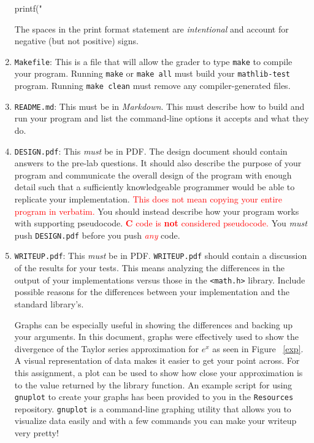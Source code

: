 \documentclass[11pt]{article}
\begin{document}
\begin{enumerate}
    \begin{codelisting}{}
printf(" %
    \end{codelisting}

    The spaces in the print format statement are \emph{intentional} and account for
    negative (but not positive) signs.

  \item \texttt{Makefile}: This is a file that will allow the grader to type
    \texttt{make} to compile your program. Running \texttt{make} or \texttt{make
    all} must build your \texttt{mathlib-test} program. Running \texttt{make clean}
    must remove any compiler-generated files.

  \item \texttt{README.md}: This must be in \emph{Markdown}. This must describe
    how to build and run your program and list the command-line options it
    accepts and what they do.

  \item \texttt{DESIGN.pdf}: This \emph{must} be in PDF\@. The design document
    should contain answers to the pre-lab questions. It should also describe the
    purpose of your program and communicate the overall design of the program
    with enough detail such that a sufficiently knowledgeable programmer would
    be able to replicate your implementation. \textcolor{red}{This does not
    mean copying your entire program in verbatim.} You should instead describe
    how your program works with supporting pseudocode.
    \textcolor{red}{\textbf{C} code is \textbf{not} considered pseudocode.} You
    \emph{must} push \texttt{DESIGN.pdf} before you push \textcolor{red}{\emph{any}}
    code.

  \item \texttt{WRITEUP.pdf}: This \emph{must} be in PDF\@. \texttt{WRITEUP.pdf}
    should contain a discussion of the results for your tests. This means
    analyzing the differences in the output of your implementations versus those
    in the \texttt{<math.h>} library. Include possible reasons for the differences
    between your implementation and the standard library's.

    Graphs can be especially useful in showing the differences and backing up your arguments. In this document, graphs were effectively used to show the divergence of the Taylor
    series approximation for $e^x$ as seen in Figure ~\ref{exp}. A visual representation of
    data makes it easier to get your point across. For this assignment, a plot can be used to
    show how close your approximation is to the value returned by the library function.
    An example script for using \texttt{gnuplot} to create your graphs has been provided to you
    in the \texttt{Resources} repository. \texttt{gnuplot} is a command-line graphing utility that allows you to visualize
    data easily and with a few commands you can make your writeup very pretty!



\end{enumerate}
\end{document}
